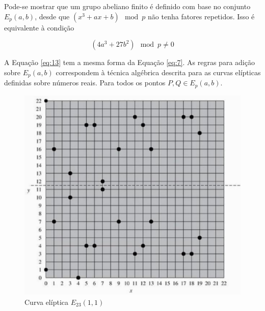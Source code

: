 Pode-se mostrar que um grupo abeliano finito é definido com base no conjunto $E_p(a, b)$, desde que $(x^3 + ax + b) \mod p$ não tenha fatores repetidos. Isso é equivalente à condição

\begin{equation}
(4a^3 + 27b^2) \mod p \neq 0 \label{eq:13}
\end{equation}

A Equação \ref{eq:13} tem a mesma forma da Equação \ref{eq:7}. As regras para adição sobre $E_p(a, b)$ correspondem à técnica algébrica descrita para as curvas elípticas definidas sobre números reais. Para todos os pontos $P, Q \in E_p(a, b)$.

\begin{figure}[h]
\centering
\includegraphics[scale=0.6, bb=0 0 515 478]{figuras/curva_sobre_corpo_finito.eps}
\caption{Curva elíptica $E_{23}(1, 1)$}
\label{fig:curvas}
\end{figure}

